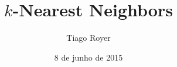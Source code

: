\documentclass[utf8]{beamer}
\begin{document}
\author{Tiago Royer}
\title{$k$-Nearest Neighbors}
\date{8 de junho de 2015}
\begin{frame}
    \titlepage
\end{frame}
\end{document}
